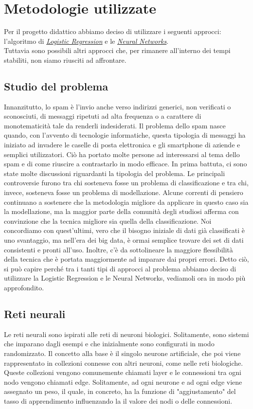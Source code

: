 \section{Metodologie utilizzate}
Per il progetto didattico abbiamo deciso di utilizzare i seguenti approcci: l'algoritmo di \href{https://en.wikipedia.org/wiki/Logistic_regression}{\textit{Logistic Regression}} e le \href{https://en.wikipedia.org/wiki/Neural_network}{\textit{Neural Networks}}.\\
Tuttavia sono possibili altri approcci che, per rimanere all'interno dei tempi stabiliti, non siamo riusciti ad affrontare. 

\subsection{Studio del problema}
Innanzitutto, lo spam è l'invio anche verso indirizzi generici, non verificati o sconosciuti, di messaggi ripetuti ad alta frequenza o a carattere di monotematicità tale da renderli indesiderati. Il problema dello spam nasce quando, con l'avvento di tecnologie informatiche, questa tipologia di messaggi ha iniziato ad invadere le caselle di posta elettronica e gli smartphone di aziende e semplici utilizzatori. Ciò ha portato molte persone ad interessarsi al tema dello spam e di come riuscire a contrastarlo in modo efficace.
\newline
In prima battuta, ci sono state molte discussioni riguardanti la tipologia del problema. Le principali controversie furono tra chi sosteneva fosse un problema di classificazione e tra chi, invece, sosteneva fosse un problema di modellazione.
Alcune correnti di pensiero continuano a sostenere che la metodologia migliore da applicare in questo caso sia la modellazione, ma la maggior parte della comunità degli studiosi afferma con convinzione che la tecnica migliore sia quella della classificazione. Noi concordiamo con quest'ultimi, vero che il bisogno iniziale di dati già classificati è uno svantaggio, ma nell'era dei big data, è ormai semplice trovare dei set di dati consistenti e pronti all'uso. Inoltre, c'è da sottolineare la maggiore flessibilità della tecnica che è portata maggiormente ad imparare dai propri errori.
\newline
Detto ciò, si può capire perché tra i tanti tipi di approcci al problema abbiamo deciso di utilizzare la Logistic Regression e le Neural Networks, vediamoli ora in modo più approfondito.
\subsection{Reti neurali}
Le reti neurali sono ispirati alle reti di neuroni biologici. Solitamente, sono sistemi che imparano dagli esempi e che inizialmente sono configurati in modo randomizzato. Il concetto alla base è il singolo neurone artificiale, che poi viene rappresentato in collezioni connesse con altri neuroni, come nelle reti biologiche. Queste collezioni vengono comunemente chiamati layer e le connessioni tra ogni nodo vengono chiamati edge. Solitamente, ad ogni neurone e ad ogni edge viene assegnato un peso, il quale, in concreto, ha la funzione di "aggiustamento" del tasso di apprendimento influenzando la il valore dei nodi o delle connessioni.

